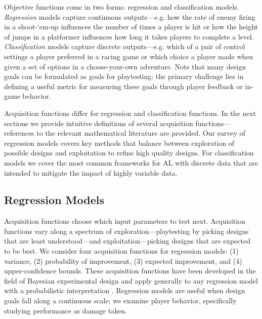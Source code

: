 \documentclass{sig-alternate}
\begin{document}
Objective functions come in two forms: regression and classification models.
\textit{Regression} models capture continuous outputs---e.g. how the rate of enemy firing in a shoot-`em-up influences the number of times a player is hit or how the height of jumps in a platformer influences how long it takes players to complete a level.
\textit{Classification} models capture discrete outputs---e.g. which of a pair of control settings a player preferred in a racing game or which choice a player made when given a set of options in a choose-your-own adventure.
Note that many design goals can be formulated as goals for playtesting: the primary challenge lies in defining a useful metric for measuring these goals through player feedback or in-game behavior.

Acquisition functions differ for regression and classification functions.
In the next sections we provide intuitive definitions of several acquisition functions---references to the relevant mathematical literature are provided.
Our survey of regression models covers key methods that balance between exploration of possible designs and exploitation to refine high quality designs.
For classification models we cover the most common frameworks for AL with discrete data that are intended to mitigate the impact of highly variable data.



\subsection{Regression Models}
Acquisition functions choose which input parameters to test next.
Acquisition functions vary along a spectrum of exploration---playtesting by picking designs that are least understood---and exploitation---picking designs that are expected to be best.
We consider four acquisition functions for regression models: (1) variance, (2) probability of improvement, (3) expected improvement, and (4) upper-confidence bounds.
These acquisition functions have been developed in the field of Bayesian experimental design and apply generally to any regression model with a probabilistic interpretation \cite{chaloner1995}.
Regression models are useful when design goals fall along a continuous scale; we examine player behavior, specifically studying performance as damage taken.
\end{document}
